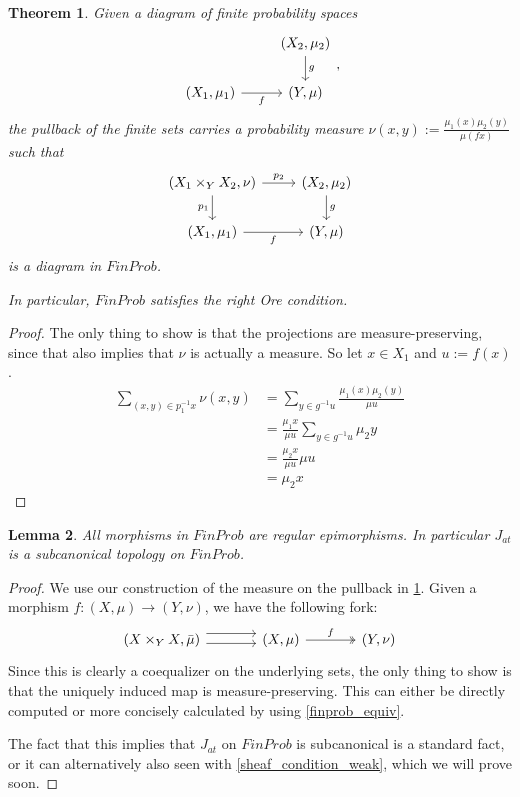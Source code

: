 \documentclass[a4paper]{amsproc}
\theoremstyle{plain}
\newtheorem{theorem}{Theorem}[section]
\newtheorem{lemma}[theorem]{Lemma}
\theoremstyle{definition}
\theoremstyle{remark}
\numberwithin{equation}{section}
\begin{document}
\begin{theorem} \label{pullback_measure}
Given a diagram of finite probability spaces
\[
\begin{tikzcd}
                               & {(X_2,\mu_2)} \arrow[d, "g"] \\
{(X_1, \mu_1)} \arrow[r, "f"'] & {(Y,\mu)}                   
\end{tikzcd},
\]
the pullback of the finite sets carries a probability measure $\nu(x,y) := \frac{\mu_1(x) \mu_2(y)}{\mu(f x)}$ such that
\[
\begin{tikzcd}
{(X_1 \times_Y X_2, \nu)} \arrow[d, "p_1"'] \arrow[r, "p_2"] & {(X_2,\mu_2)} \arrow[d, "g"] \\
{(X_1, \mu_1)} \arrow[r, "f"']                               & {(Y,\mu)}                   
\end{tikzcd}
\]
is a diagram in $FinProb$.

In particular, $FinProb$ satisfies the right Ore condition.
\end{theorem}
\begin{proof}
The only thing to show is that the projections are measure-preserving, since that also implies that $\nu$ is actually a measure. So let $x \in X_1$ and $u := f(x)$.
\begin{align*}
\sum_{(x,y) \in p_1^{-1} x} \nu(x,y) &= \sum_{y \in g^{-1} u} \frac{\mu_1(x)\mu_2(y)}{\mu u} \\
&= \frac{\mu_1 x}{\mu u} \sum_{y \in g^{-1} u} \mu_2 y \\
&= \frac{\mu_2 x}{\mu u} \mu u \\
&= \mu_2 x
\end{align*}
\end{proof}

\begin{lemma}\label{subcanonical} All morphisms in $FinProb$ are regular epimorphisms. In particular $J_{at}$ is a subcanonical topology on $FinProb$.
\end{lemma}
\begin{proof}
We use our construction of the measure on the pullback in \ref{pullback_measure}. Given a morphism $f:(X,\mu)\rightarrow (Y, \nu)$, we have the following fork:
\[
\begin{tikzcd}[column sep=large]
(X \times_Y X, \bar{\mu}) \arrow[r, shift left=2] \arrow[r, shift right] & (X,\mu) \arrow[r, "f", two heads] & (Y,\nu)
\end{tikzcd}
\]
Since this is clearly a coequalizer on the underlying sets, the only thing to show is that the uniquely induced map is measure-preserving. This can either be directly computed or more concisely calculated by using \ref{finprob_equiv}.

The fact that this implies that $J_{at}$ on $FinProb$ is subcanonical is a standard fact, or it can alternatively also seen with \ref{sheaf_condition_weak}, which we will prove soon.
\end{proof}
\end{document}
